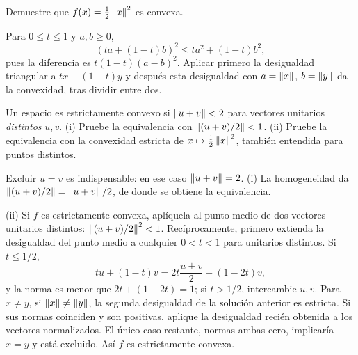 \begin{ejercicio}\label{ej:v3-l05-2}
Demuestre que $f(x)=\tfrac12\left\lVert x\right\rVert^2$ es convexa.
\end{ejercicio}
\begin{solucion}
Para $0\leq t\leq1$ y $a,b\geq0$,
\[
 (ta+(1-t)b)^2\leq ta^2+(1-t)b^2,
\]
pues la diferencia es $t(1-t)(a-b)^2$. Aplicar primero la desigualdad triangular a $tx+(1-t)y$ y después esta desigualdad con $a=\left\lVert x\right\rVert$, $b=\left\lVert y\right\rVert$ da la convexidad, tras dividir entre dos.
\end{solucion}

\begin{ejercicio}\label{ej:v3-l05-3}
Un espacio es estrictamente convexo si $\left\lVert u+v\right\rVert<2$ para vectores unitarios \emph{distintos} $u,v$. (i) Pruebe la equivalencia con $\left\lVert(u+v)/2\right\rVert<1$. (ii) Pruebe la equivalencia con la convexidad estricta de $x\mapsto\tfrac12\left\lVert x\right\rVert^2$, también entendida para puntos distintos.
\end{ejercicio}
\begin{solucion}
Excluir $u=v$ es indispensable: en ese caso $\left\lVert u+v\right\rVert=2$. (i) La homogeneidad da $\left\lVert(u+v)/2\right\rVert=\left\lVert u+v\right\rVert/2$, de donde se obtiene la equivalencia.

(ii) Si $f$ es estrictamente convexa, aplíquela al punto medio de dos vectores unitarios distintos: $\left\lVert(u+v)/2\right\rVert^2<1$. Recíprocamente, primero extienda la desigualdad del punto medio a cualquier $0<t<1$ para unitarios distintos. Si $t\leq1/2$,
\[
 tu+(1-t)v=2t\frac{u+v}{2}+(1-2t)v,
\]
y la norma es menor que $2t+(1-2t)=1$; si $t>1/2$, intercambie $u,v$. Para $x\ne y$, si $\left\lVert x\right\rVert\ne\left\lVert y\right\rVert$, la segunda desigualdad de la solución anterior es estricta. Si sus normas coinciden y son positivas, aplique la desigualdad recién obtenida a los vectores normalizados. El único caso restante, normas ambas cero, implicaría $x=y$ y está excluido. Así $f$ es estrictamente convexa.
\end{solucion}

